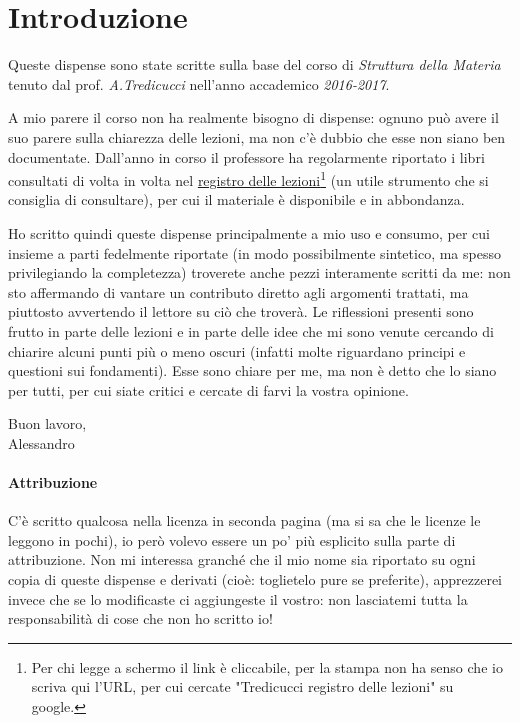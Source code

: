 
\chapter*{Introduzione}

Queste dispense sono state scritte sulla base del corso di \textit{Struttura della Materia} tenuto dal prof. \textit{A.Tredicucci} nell'anno accademico \textit{2016-2017}.
\newline

A mio parere il corso non ha realmente bisogno di dispense: ognuno può avere il suo parere sulla chiarezza delle lezioni, ma non c'è dubbio che esse non siano ben documentate. Dall'anno in corso il professore ha regolarmente riportato i libri consultati di volta in volta nel \href{http://unimap.unipi.it/registri/dettregistriNEW.php?re=181626::::&ri=12126}{registro delle lezioni}\footnote{Per chi legge a schermo il link è cliccabile, per la stampa non ha senso che io scriva qui l'URL, per cui cercate "Tredicucci registro delle lezioni" su google.} (un utile strumento che si consiglia di consultare), per cui il materiale è disponibile e in abbondanza.
\newline

Ho scritto quindi queste dispense principalmente a mio uso e consumo, per cui insieme a parti fedelmente riportate (in modo possibilmente sintetico, ma spesso privilegiando la completezza) troverete anche pezzi interamente scritti da me: non sto affermando di vantare un contributo diretto agli argomenti trattati, ma piuttosto avvertendo il lettore su ciò che troverà. Le riflessioni presenti sono frutto in parte delle lezioni e in parte delle idee che mi sono venute cercando di chiarire alcuni punti più o meno oscuri (infatti molte riguardano principi e questioni sui fondamenti). Esse sono chiare per me, ma non è detto che lo siano per tutti, per cui siate critici e cercate di farvi la vostra opinione.

\begin{flushright}
	Buon lavoro,\\
	Alessandro
\end{flushright}

\subsubsection*{Attribuzione}
C'è scritto qualcosa nella licenza in seconda pagina (ma si sa che le licenze le leggono in pochi), io però volevo essere un po' più esplicito sulla parte di attribuzione. Non mi interessa granché che il mio nome sia riportato su ogni copia di queste dispense e derivati (cioè: toglietelo pure se preferite), apprezzerei invece che se lo modificaste ci aggiungeste il vostro: non lasciatemi tutta la responsabilità di cose che non ho scritto io!
